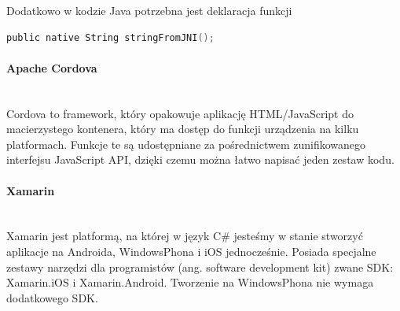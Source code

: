\documentclass{article}
\numberwithin{equation}{section}
\begin{document}
Dodatkowo w kodzie Java potrzebna jest deklaracja funkcji
\begin{lstlisting}[language=C]
public native String stringFromJNI();
\end{lstlisting}
\paragraph{Apache Cordova}\mbox{}\\
Cordova to framework, który opakowuje aplikację HTML/JavaScript do macierzystego kontenera, który ma dostęp do funkcji urządzenia na kilku platformach. Funkcje te są udostępniane za pośrednictwem zunifikowanego interfejsu JavaScript API, dzięki czemu można łatwo napisać jeden zestaw kodu.
\paragraph{Xamarin}\mbox{}\\
Xamarin jest platformą, na której w język C\# jesteśmy w stanie stworzyć aplikacje na Androida, WindowsPhona i iOS jednocześnie. Posiada specjalne zestawy narzędzi dla programistów (ang. software development kit) zwane SDK: Xamarin.iOS i Xamarin.Android. Tworzenie na WindowsPhona nie wymaga dodatkowego SDK.
\end{document}
